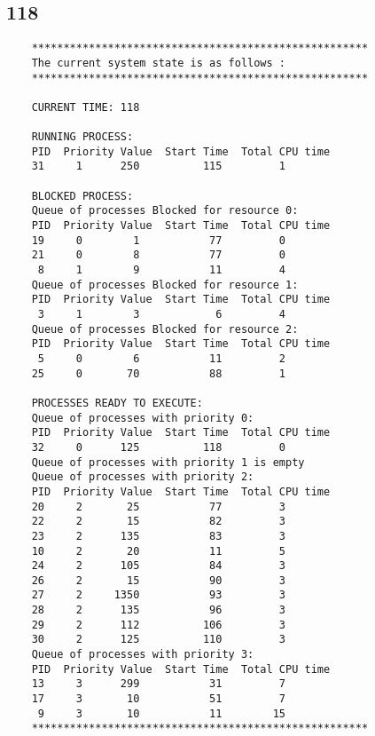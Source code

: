 \documentclass{article}
\begin{document}
\subsection*{118}
\begin{verbatim}
    *****************************************************
    The current system state is as follows : 
    *****************************************************
     
    CURRENT TIME: 118
    
    RUNNING PROCESS:
    PID  Priority Value  Start Time  Total CPU time
    31     1      250          115         1
    
    BLOCKED PROCESS:
    Queue of processes Blocked for resource 0:
    PID  Priority Value  Start Time  Total CPU time
    19     0        1           77         0
    21     0        8           77         0
     8     1        9           11         4
    Queue of processes Blocked for resource 1:
    PID  Priority Value  Start Time  Total CPU time
     3     1        3            6         4
    Queue of processes Blocked for resource 2:
    PID  Priority Value  Start Time  Total CPU time
     5     0        6           11         2
    25     0       70           88         1
    
    PROCESSES READY TO EXECUTE:
    Queue of processes with priority 0:
    PID  Priority Value  Start Time  Total CPU time
    32     0      125          118         0
    Queue of processes with priority 1 is empty
    Queue of processes with priority 2:
    PID  Priority Value  Start Time  Total CPU time
    20     2       25           77         3
    22     2       15           82         3
    23     2      135           83         3
    10     2       20           11         5
    24     2      105           84         3
    26     2       15           90         3
    27     2     1350           93         3
    28     2      135           96         3
    29     2      112          106         3
    30     2      125          110         3
    Queue of processes with priority 3:
    PID  Priority Value  Start Time  Total CPU time
    13     3      299           31         7
    17     3       10           51         7
     9     3       10           11        15
    *****************************************************
\end{verbatim}
\end{document}
